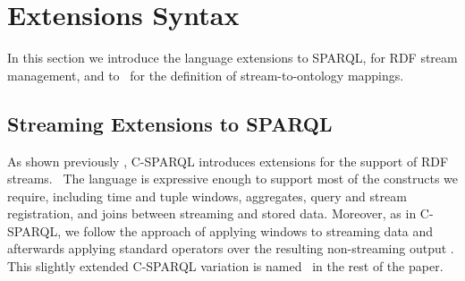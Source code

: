 \section{Extensions Syntax}
\label{syntax}

In this section we introduce the language extensions to \linebreak SPARQL, for RDF stream management, and to \rtwoo\, for the
definition of stream-to-ontology mappings.

\subsection{Streaming Extensions to SPARQL}
\label{streamingsparqlsyntax}

As shown previously %
, C-SPARQL introduces extensions for the support of RDF streams.\ %
The language is expressive enough \linebreak to support most of the constructs we require, including time and tuple windows,
aggregates, query and stream registration, and joins between streaming and stored data. Moreover, as in C-SPARQL, we
follow the approach of applying windows to streaming data and afterwards applying standard operators over the resulting
non-streaming output \cite{DellaValle_09}. This slightly extended C-SPARQL variation is named \sparqlstr\ in the rest
of the paper.

